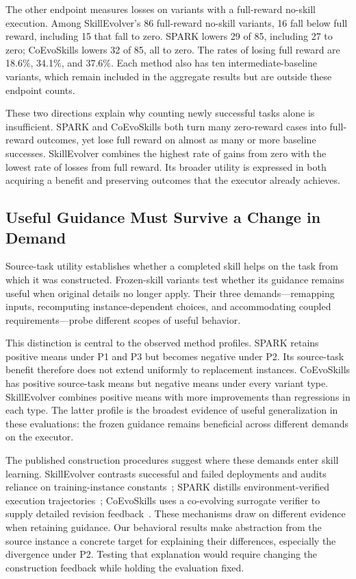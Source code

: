 The other endpoint measures losses on variants with a full-reward no-skill execution. Among SkillEvolver's 86 full-reward no-skill variants, 16 fall below full reward, including 15 that fall to zero. SPARK lowers 29 of 85, including 27 to zero; CoEvoSkills lowers 32 of 85, all to zero. The rates of losing full reward are 18.6\%, 34.1\%, and 37.6\%. Each method also has ten intermediate-baseline variants, which remain included in the aggregate results but are outside these endpoint counts.

These two directions explain why counting newly successful tasks alone is insufficient. SPARK and CoEvoSkills both turn many zero-reward cases into full-reward outcomes, yet lose full reward on almost as many or more baseline successes. SkillEvolver combines the highest rate of gains from zero with the lowest rate of losses from full reward. Its broader utility is expressed in both acquiring a benefit and preserving outcomes that the executor already achieves.

\subsection{Useful Guidance Must Survive a Change in Demand}

Source-task utility establishes whether a completed skill helps on the task from which it was constructed. Frozen-skill variants test whether its guidance remains useful when original details no longer apply. Their three demands---remapping inputs, recomputing instance-dependent choices, and accommodating coupled requirements---probe different scopes of useful behavior.

This distinction is central to the observed method profiles. SPARK retains positive means under P1 and P3 but becomes negative under P2. Its source-task benefit therefore does not extend uniformly to replacement instances. CoEvoSkills has positive source-task means but negative means under every variant type. SkillEvolver combines positive means with more improvements than regressions in each type. The latter profile is the broadest evidence of useful generalization in these evaluations: the frozen guidance remains beneficial across different demands on the executor.

The published construction procedures suggest where these demands enter skill learning. SkillEvolver contrasts successful and failed deployments and audits reliance on training-instance constants~\cite{zhang2026skillevolver}; SPARK distills environment-verified execution trajectories~\cite{zhou2026spark}; CoEvoSkills uses a co-evolving surrogate verifier to supply detailed revision feedback~\cite{zhang2026coevoskills}. These mechanisms draw on different evidence when retaining guidance. Our behavioral results make abstraction from the source instance a concrete target for explaining their differences, especially the divergence under P2. Testing that explanation would require changing the construction feedback while holding the evaluation fixed.

